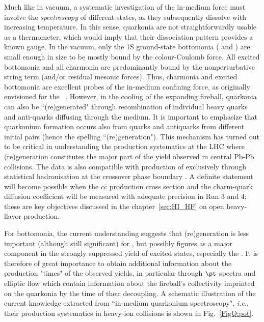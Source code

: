 \documentclass[../report.tex]{subfiles}
\begin{document}
Much like in vacuum, a systematic investigation of the in-medium force must involve the {\em spectroscopy} of different states, as they subsequently dissolve with increasing temperature. In this sense, quarkonia are not straightforwardly usable as a thermometer, which would imply that their dissociation pattern provides a known gauge. In the vacuum, only the 1S ground-state bottomonia ( and \PGhb) are small enough in size to be mostly bound by the colour-Coulomb force. All excited bottomonia and all charmonia are predominantly bound by the nonperturbative string term (and/or residual mesonic forces). 
Thus, charmonia and excited bottomonia are excellent probes of the in-medium confining force, as originally envisioned for the \PJgy~\cite{Matsui:1986dk}.
However, in the cooling of the expanding fireball, quarkonia can also be ``(re)generated" through recombination of individual heavy quarks and anti-quarks diffusing through the medium. It is important to emphasize that quarkonium formation occurs also from quarks and antiquarks from different initial pairs (hence the spelling ``(re)generation").
This mechanism \cite{BraunMunzinger:2000px,Thews:2000rj} has turned out to be critical in understanding the \PJgy production systematics at the LHC where (re)generation constitutes the major part of the yield observed in central Pb-Pb collisions.
The data is also compatible with production of \PJgy exclusively through statistical hadronisation at the crossover phase boundary \cite{Andronic:2017pug}.
A definite statement will become possible when the $c\bar{c}$ production cross section and the charm-quark diffusion coefficient will be measured with adequate precision in Run 3 and 4; these are key objectives discussed in the chapter~\ref{sec:HI_HF} on open heavy-flavor production.

For bottomonia, the current understanding suggests that (re)generation is less important (although still significant) for , but possibly figures as a major component in the strongly suppressed yield of excited states, especially the . It is therefore of great importance to obtain additional information about the production "times" of the observed yields, in particular through $\pt$ spectra and elliptic flow which contain information about the fireball's collectivity imprinted on the quarkonia by the time of their decoupling. A schematic illustration of the current knowledge extracted from ``in-medium quarkonium spectroscopy", {\it i.e.}, their production systematics in heavy-ion collisions is shown in Fig.~\ref{FigQ:pot}.        
\end{document}
